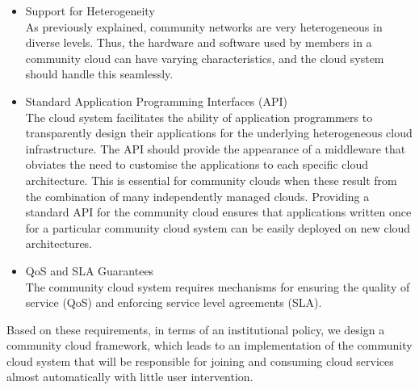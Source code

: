 \begin{itemize}
\item Support for Heterogeneity
\\As previously explained, community networks are very heterogeneous in diverse levels. Thus, the hardware and software used by members in a community cloud can have varying characteristics, and the cloud system should handle this seamlessly.


\item Standard Application Programming Interfaces (API)
\\The cloud system facilitates the ability of application programmers to transparently design their applications for the underlying heterogeneous cloud infrastructure. 
The API should provide the appearance of a middleware that obviates the need to customise the applications to each specific cloud architecture. This is essential for community clouds when these result from the combination of many independently managed clouds. Providing a standard API for the community cloud ensures that applications written once for a particular community cloud system can be easily deployed on new cloud architectures. 

\item QoS and SLA Guarantees
\\The community cloud system requires mechanisms for ensuring the quality of service (QoS) and enforcing service level agreements (SLA).

\end{itemize}

Based on these requirements, in terms of an institutional policy, we design a community cloud framework, which leads to an implementation of the community cloud system that will be responsible for joining and consuming cloud services almost automatically with little user intervention. 